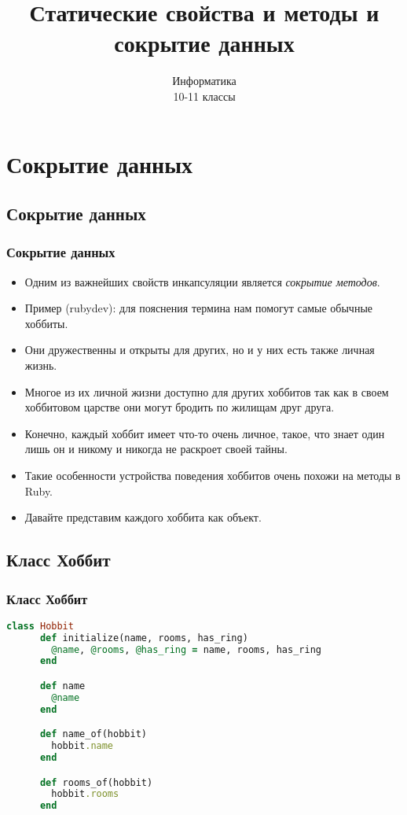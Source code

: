 \documentclass[compress,red]{beamer}
\title{Статические свойства и методы и сокрытие данных}
\author{Информатика \\ 10-11 классы}
\begin{document}
\maketitle

\section{Сокрытие данных}

\subsection{Сокрытие данных}
\begin{frame}[fragile]
  \frametitle{Сокрытие данных}
  \begin{itemize}
    \item Одним из важнейших свойств инкапсуляции является \emph{сокрытие методов}.
    \item Пример (rubydev): для пояснения термина нам помогут самые обычные хоббиты.
    \item Они дружественны и открыты для других, но и у них есть также личная жизнь. 
    \item Многое из их личной жизни доступно для других хоббитов так как в своем хоббитовом царстве они могут бродить по жилищам друг друга. 
    \item Конечно, каждый хоббит имеет что-то очень личное, такое, что знает один лишь он и никому и никогда не раскроет своей тайны. 
    \item Такие особенности устройства поведения хоббитов очень похожи на методы в Ruby. 
    \item Давайте представим каждого хоббита как объект.
  \end{itemize}
\end{frame}

\subsection{Класс Хоббит}
\begin{frame}[fragile]
  \frametitle{Класс Хоббит}
  \scriptsize{
  \begin{lstlisting}[language=ruby,basicstyle=\footnotesize,label=ruby1,caption=Класс Хоббит]
    class Hobbit
      def initialize(name, rooms, has_ring)
        @name, @rooms, @has_ring = name, rooms, has_ring
      end

      def name
        @name
      end

      def name_of(hobbit)
        hobbit.name
      end

      def rooms_of(hobbit)
        hobbit.rooms
      end
  \end{lstlisting}
  }
\end{frame}
\end{document}
